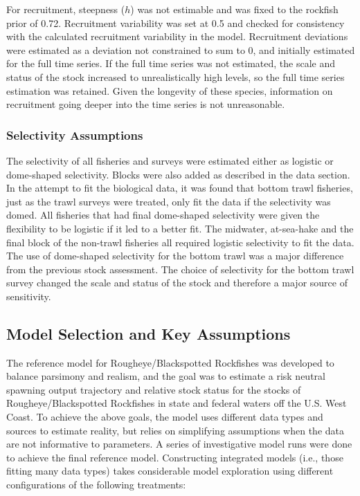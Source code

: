 \documentclass[
]{scrartcl}
\begin{document}
For recruitment, steepness (\(h\)) was not estimable and was fixed to
the rockfish prior of 0.72. Recruitment variability was set at 0.5 and
checked for consistency with the calculated recruitment variability in
the model. Recruitment deviations were estimated as a deviation not
constrained to sum to 0, and initially estimated for the full time
series. If the full time series was not estimated, the scale and status
of the stock increased to unrealistically high levels, so the full time
series estimation was retained. Given the longevity of these species,
information on recruitment going deeper into the time series is not
unreasonable.

\subsubsection{Selectivity Assumptions}\label{selectivity-assumptions}

The selectivity of all fisheries and surveys were estimated either as
logistic or dome-shaped selectivity. Blocks were also added as described
in the data section. In the attempt to fit the biological data, it was
found that bottom trawl fisheries, just as the trawl surveys were
treated, only fit the data if the selectivity was domed. All fisheries
that had final dome-shaped selectivity were given the flexibility to be
logistic if it led to a better fit. The midwater, at-sea-hake and the
final block of the non-trawl fisheries all required logistic selectivity
to fit the data. The use of dome-shaped selectivity for the bottom trawl
was a major difference from the previous stock assessment. The choice of
selectivity for the bottom trawl survey changed the scale and status of
the stock and therefore a major source of sensitivity.

\subsection{Model Selection and Key
Assumptions}\label{model-selection-and-key-assumptions}

The reference model for Rougheye/Blackspotted Rockfishes was developed
to balance parsimony and realism, and the goal was to estimate a risk
neutral spawning output trajectory and relative stock status for the
stocks of Rougheye/Blackspotted Rockfishes in state and federal waters
off the U.S. West Coast. To achieve the above goals, the model uses
different data types and sources to estimate reality, but relies on
simplifying assumptions when the data are not informative to parameters.
A series of investigative model runs were done to achieve the final
reference model. Constructing integrated models (i.e., those fitting
many data types) takes considerable model exploration using different
configurations of the following treatments:
\end{document}
